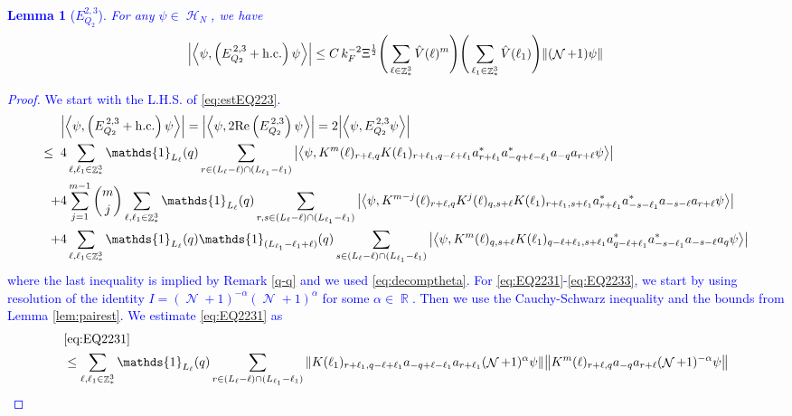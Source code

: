 \documentclass[sn-mathphys, Numbered ,a4paper]{sn-jnl}%
\DeclareMathOperator{\R}{\mathbb{R}}
\DeclareMathOperator{\Z}{\mathbb{Z}}
\DeclareMathOperator{\HH}{\mathcal{H}}
\DeclareMathOperator{\NN}{\mathcal{N}}
\newcommand{\half}{\frac{1}{2}}
\newcommand{\eva}[1]{\left\langle #1 \right\rangle}
\theoremstyle{plain}
\newtheorem{lemma}[theorem]{Lemma}
\theoremstyle{definition}
\theoremstyle{remark}
\theoremstyle{plain}
\theoremstyle{definition}
\theoremstyle{remark}
\begin{document}
\textcolor{blue}{\begin{lemma}[$E_{Q_2}^{2,3}$]
	For any $\psi \in \HH_N$, we have
	\begin{align}
		\abs{\eva{\psi,\left(E^{\,2,3}_{Q_2}+\mathrm{h.c.}\right) \psi }}
		\leq  C\, k_{F}^{-2} \Xi^{\half} \Bigg(\sum\limits_{\ell \in \Z^3_*} \hat{V}(\ell)^m \Bigg) \Bigg( \sum\limits_{\ell_1 \in \Z^3_*}\hat{V}(\ell_1) \Bigg)  \norm { (\NN+1) \psi } \label{eq:estEQ223}
	\end{align}
\end{lemma}
\begin{proof}
	We start with the L.H.S. of \eqref{eq:estEQ223}.
	\begin{align}
		&\abs{\eva{\psi,\left(E^{\,2,3}_{Q_2}+\mathrm{h.c.}\right) \psi }} = \abs{\eva{\psi,2\mathrm{Re}\left(E^{\,2,3}_{Q_2}\right) \psi }} = 2\abs{\eva{\psi, E^{\,2,3}_{Q_2} \psi }}\nonumber\\
		\leq\;\;&4 \sum\limits_{\ell, \ell_1\in \Z^3_*} \mathds{1}_{L_{\ell}}(q) \sum\limits_{r \in (L_{\ell}-\ell) \cap (L_{\ell_1}-\ell_1)} \abs{\eva{\psi, K^m(\ell)_{r+\ell,q} K(\ell_1)_{r+\ell_1,q-\ell+\ell_1}  a^*_{r+\ell_1}a^*_{-q+\ell-\ell_1}a_{-q}a_{r+\ell} \psi}} \label{eq:EQ2231}\\
		\;+&4 \sum\limits_{j=1}^{m-1} {{m}\choose j} \sum\limits_{\ell, \ell_1\in \Z^3_*}\mathds{1}_{L_{\ell}}(q) \sum\limits_{r,s \in (L_{\ell}-\ell) \cap (L_{\ell_1}-\ell_1)}  \abs{\eva{\psi, K^{m-j}(\ell)_{r+\ell, q} K^{j}(\ell)_{q,s+\ell} K(\ell_1)_{r+\ell_1,s+\ell_1}  a^*_{r+\ell_1}a^*_{-s-\ell_1}a_{-s-\ell}a_{r+\ell} \psi }} \label{eq:EQ2232}\\
		\;+&4\sum\limits_{\ell, \ell_1\in \Z^3_*} \mathds{1}_{L_{\ell}}(q) \mathds{1}_{(L_{\ell_1}-\ell_1+\ell)}(q) \sum\limits_{s \in (L_{\ell}-\ell) \cap (L_{\ell_1}-\ell_1)} \abs{\eva{\psi, K^m(\ell)_{q,s+\ell} K(\ell_1)_{q-\ell+\ell_1,s+\ell_1}  a^*_{q-\ell+\ell_1}a^*_{-s-\ell_1}a_{-s-\ell}a_{q} \psi}} \label{eq:EQ2233}
	\end{align}
	where the last inequality is implied by Remark \ref{q-q} and we used \eqref{eq:decomptheta}.
	For \eqref{eq:EQ2231}-\eqref{eq:EQ2233}, we start by using resolution of the identity $I = (\NN+1)^{-\alpha}(\NN+1)^{\alpha}$ for some $\alpha \in \R$. Then we use the Cauchy-Schwarz inequality and the bounds from Lemma \ref{lem:pairest}.
	We estimate \eqref{eq:EQ2231} as 
	\begin{align}
		&\eqref{eq:EQ2231}\nonumber\\
		&\leq \sum\limits_{\ell, \ell_1\in \Z^3_*} \mathds{1}_{L_{\ell}}(q)  \sum\limits_{r\in(L_{\ell}-\ell) \cap (L_{\ell_1}-\ell_1)} \norm{ K(\ell_1)_{r+\ell_1,q-\ell+\ell_1} a_{-q+\ell-\ell_1} a_{r+\ell_1}(\NN+1)^{\alpha}\psi}\norm{ K^m(\ell)_{r+\ell,q} a_{-q}a_{r+\ell} (\NN+1)^{-\alpha} \psi }\nonumber\\

\end{align}
\end{proof}}
\end{document}
